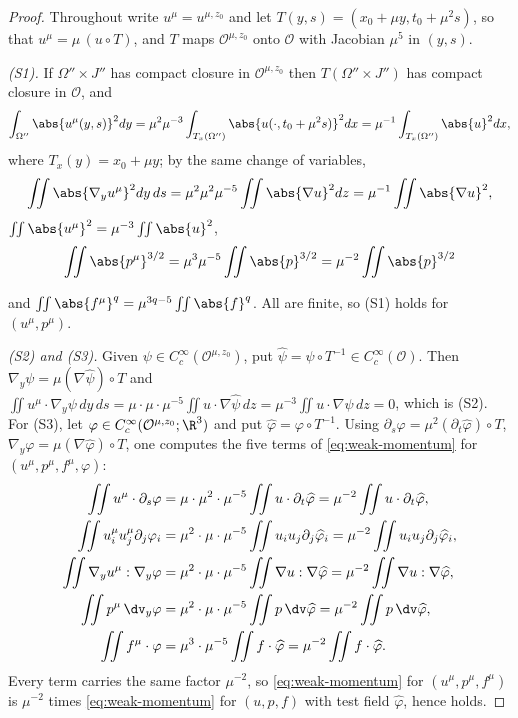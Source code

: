 \documentclass[11pt,reqno]{amsart}
\begin{document}
\begin{proof}
Throughout write $u^{\mu}=u^{\mu,z_{0}}$ and let
$T(y,s)=(x_{0}+\mu y,t_{0}+\mu^{2}s)$, so that $u^{\mu}=\mu\,(u\circ T)$, and
$T$ maps $\mathcal{O}^{\mu,z_{0}}$ onto $\mathcal{O}$ with Jacobian
$\mu^{5}$ in $(y,s)$.

\emph{(S1).} If $\Omega''\times J''$ has compact closure in
$\mathcal{O}^{\mu,z_{0}}$ then $T(\Omega''\times J'')$ has compact closure in
$\mathcal{O}$, and
\[
  \int_{\Omega''}\abs{u^{\mu}(y,s)}^{2}dy
  =\mu^{2}\mu^{-3}\int_{T_{x}(\Omega'')}\abs{u(\cdot,t_{0}+\mu^{2}s)}^{2}dx
  =\mu^{-1}\int_{T_{x}(\Omega'')}\abs{u}^{2}dx ,
\]
where $T_{x}(y)=x_{0}+\mu y$; by the same change of variables,
\[
\iint\abs{\nabla_{y}u^{\mu}}^{2}dy\,ds
 =\mu^{2}\mu^{2}\mu^{-5}\iint\abs{\nabla u}^{2}dz=\mu^{-1}\iint\abs{\nabla u}^{2}
,
\]
$\iint\abs{u^{\mu}}^{2}=\mu^{-3}\iint\abs{u}^{2}$,
\[
\iint\abs{p^{\mu}}^{3/2}=\mu^{3}\mu^{-5}\iint\abs{p}^{3/2}=\mu^{-2}\iint\abs{p}^{3/2}
\]

and
$\iint\abs{f^{\mu}}^{q}=\mu^{3q-5}\iint\abs{f}^{q}$. All are finite, so (S1)
holds for $(u^{\mu},p^{\mu})$.

\emph{(S2) and (S3).} Given $\psi\in C^{\infty}_{c}(\mathcal{O}^{\mu,z_{0}})$,
put $\widehat\psi=\psi\circ T^{-1}\in C_{c}^{\infty}(\mathcal{O})$. Then
$\nabla_{y}\psi=\mu(\nabla\widehat\psi)\circ T$ and
$\iint u^{\mu}\cdot\nabla_{y}\psi\,dy\,ds
 =\mu\cdot\mu\cdot\mu^{-5}\iint u\cdot\nabla\widehat\psi\,dz
 =\mu^{-3}\iint u\cdot\nabla\widehat\psi\,dz=0$, which is (S2). For (S3), let
$\varphi\in C_{c}^{\infty}(\mathcal{O}^{\mu,z_{0}};\R^{3})$ and put
$\widehat\varphi=\varphi\circ T^{-1}$. Using
$\partial_{s}\varphi=\mu^{2}(\partial_{t}\widehat\varphi)\circ T$,
$\nabla_{y}\varphi=\mu(\nabla\widehat\varphi)\circ T$, one computes the five
terms of \eqref{eq:weak-momentum} for $(u^{\mu},p^{\mu},f^{\mu},\varphi)$:
\[
\begin{aligned}
  \iint u^{\mu}\cdot\partial_{s}\varphi
    &=\mu\cdot\mu^{2}\cdot\mu^{-5}\iint u\cdot\partial_{t}\widehat\varphi
     =\mu^{-2}\iint u\cdot\partial_{t}\widehat\varphi, \\
  \iint u^{\mu}_{i}u^{\mu}_{j}\partial_{j}\varphi_{i}
    &=\mu^{2}\cdot\mu\cdot\mu^{-5}\iint u_{i}u_{j}\partial_{j}\widehat\varphi_{i}
     =\mu^{-2}\iint u_{i}u_{j}\partial_{j}\widehat\varphi_{i}, \\
  \iint\nabla_{y}u^{\mu}:\nabla_{y}\varphi
    &=\mu^{2}\cdot\mu\cdot\mu^{-5}\iint\nabla u:\nabla\widehat\varphi
     =\mu^{-2}\iint\nabla u:\nabla\widehat\varphi, \\
  \iint p^{\mu}\,\dv_{y}\varphi
    &=\mu^{2}\cdot\mu\cdot\mu^{-5}\iint p\,\dv\widehat\varphi
     =\mu^{-2}\iint p\,\dv\widehat\varphi, \\
  \iint f^{\mu}\cdot\varphi
    &=\mu^{3}\cdot\mu^{-5}\iint f\cdot\widehat\varphi
     =\mu^{-2}\iint f\cdot\widehat\varphi .
\end{aligned}
\]
Every term carries the same factor $\mu^{-2}$, so \eqref{eq:weak-momentum} for
$(u^{\mu},p^{\mu},f^{\mu})$ is $\mu^{-2}$ times \eqref{eq:weak-momentum} for
$(u,p,f)$ with test field $\widehat\varphi$, hence holds.


\end{proof}
\end{document}
